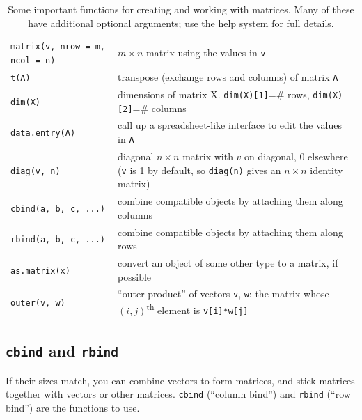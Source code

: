 \documentclass[11pt]{article}\usepackage[]{graphicx}\usepackage[]{color}
\newcommand{\code}[1]{{\tt #1}}
\numberwithin{exercise}{section}
\begin{document}
\begin{table}[t]
\begin{tabular}{p{145pt}p{290pt}}
\hline
\code{matrix(v, nrow = m, ncol = n)} & $m \times n$ matrix using the values in \code{v} \\
\code{t(A)} & transpose (exchange rows and columns) of matrix \code{A} \\
\code{dim(X)} & dimensions of matrix X. \code{dim(X)[1]}=\# rows, \code{dim(X)[2]}=\# columns \\
\code{data.entry(A)} & call up a spreadsheet-like interface to edit the values in \code{A} \\
\code{diag(v, n)} & diagonal $n \times n$ matrix with $v$ on diagonal, 0 elsewhere 
(\code{v} is 1 by default, so \code{diag(n)} gives an $n \times n$ identity matrix)\\
\code{cbind(a, b, c, ...)} & combine compatible objects by attaching them along columns \\
\code{rbind(a, b, c, ...)} & combine compatible objects by attaching them along rows \\
\code{as.matrix(x)} & convert an object of some other type to a matrix, if possible \\
\code{outer(v, w)} & ``outer product'' of vectors \code{v}, \code{w}: the matrix whose 
$(i,j)$\textsuperscript{th}
element is \code{v[i]*w[j]} \\
\hline
\end{tabular}
\caption{Some important functions for creating and working with matrices. Many
of these have additional optional arguments; use the help system for full details.}
\label{MatrixFunctions}
\end{table}

\subsection{\code{cbind} and \code{rbind}} 
If their sizes match, you can combine vectors to form matrices, and
stick matrices together with vectors or other matrices.
\code{cbind} (``column bind'') and \code{rbind}
(``row bind'') are the functions to use.
\end{document}
